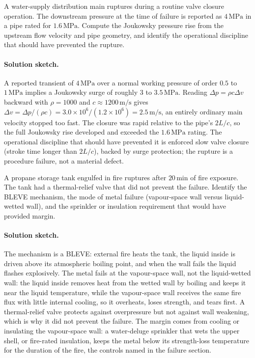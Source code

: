 \begin{exercise}
A water-supply distribution main ruptures during a routine valve
closure operation. The downstream pressure at the time of failure is
reported as $4\,\text{MPa}$ in a pipe rated for $1.6\,\text{MPa}$.
Compute the Joukowsky pressure rise from the upstream flow velocity
and pipe geometry, and identify the operational discipline that
should have prevented the rupture.

\paragraph{Solution sketch.} A reported transient of $4\,\text{MPa}$ over
a normal working pressure of order $0.5$ to $1\,\text{MPa}$ implies a
Joukowsky surge of roughly $3$ to $3.5\,\text{MPa}$. Reading
$\Delta p = \rho c \Delta v$ backward with $\rho = 1000$ and $c \approx
1200\,\text{m}/\text{s}$ gives $\Delta v = \Delta p/(\rho c) =
3.0\times 10^6/(1.2\times 10^6) = 2.5\,\text{m}/\text{s}$, an entirely
ordinary main velocity stopped too fast. The closure was rapid relative
to the pipe's $2L/c$, so the full Joukowsky rise developed and exceeded
the $1.6\,\text{MPa}$ rating. The operational discipline that should have
prevented it is enforced slow valve closure (stroke time longer than
$2L/c$), backed by surge protection; the rupture is a procedure failure,
not a material defect.
\end{exercise}

\begin{exercise}
A propane storage tank engulfed in fire ruptures after $20\,\text{min}$
of fire exposure. The tank had a thermal-relief valve that did not
prevent the failure. Identify the BLEVE mechanism, the mode of metal
failure (vapour-space wall versus liquid-wetted wall), and the
sprinkler or insulation requirement that would have provided
margin.

\paragraph{Solution sketch.} The mechanism is a BLEVE: external fire
heats the tank, the liquid inside is driven above its atmospheric boiling
point, and when the wall fails the liquid flashes explosively. The metal
fails at the vapour-space wall, not the liquid-wetted wall: the liquid
inside removes heat from the wetted wall by boiling and keeps it near the
liquid temperature, while the vapour-space wall receives the same fire
flux with little internal cooling, so it overheats, loses strength, and
tears first. A thermal-relief valve protects against overpressure but not
against wall weakening, which is why it did not prevent the failure. The
margin comes from cooling or insulating the vapour-space wall: a
water-deluge sprinkler that wets the upper shell, or fire-rated
insulation, keeps the metal below its strength-loss temperature for the
duration of the fire, the controls named in the failure section.
\end{exercise}

